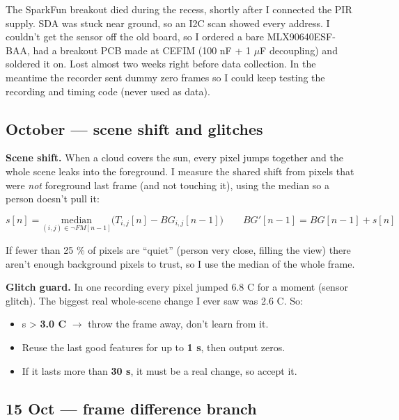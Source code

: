 \documentclass[11pt,a4paper]{article}
\providecommand{\tightlist}{\setlength{\itemsep}{0pt}\setlength{\parskip}{0pt}}
\begin{document}
The SparkFun breakout died
during the recess, shortly
after I connected the PIR
supply. SDA was stuck near
ground, so an I2C scan showed
every address. I couldn't get
the sensor off the old board,
so I ordered a bare
MLX90640ESF-BAA, had a
breakout PCB made at CEFIM
(100 nF + 1 $\mu$F decoupling) and
soldered it on. Lost almost
two weeks right before data
collection. In the meantime
the recorder sent dummy zero
frames so I could keep testing
the recording and timing code
(never used as data).

\hypertarget{october-scene-shift-and-glitches}{%
\subsection{October --- scene
shift and
glitches}\label{october-scene-shift-and-glitches}}

\textbf{Scene shift.} When a
cloud covers the sun, every
pixel jumps together and the
whole scene leaks into the
foreground. I measure the
shared shift from pixels that
were \emph{not} foreground
last frame (and not touching
it), using the median so a
person doesn't pull it:

\[
s[n] = \underset{(i,j)\in\neg FM[n-1]}{\mathrm{median}}\big(T_{i,j}[n]-BG_{i,j}[n-1]\big) \qquad BG'[n-1] = BG[n-1] + s[n]
\]

If fewer than 25 \% of pixels
are ``quiet'' (person very
close, filling the view) there
aren't enough background
pixels to trust, so I use the
median of the whole frame.

\textbf{Glitch guard.} In one
recording every pixel jumped
6.8 \textdegree{}C for a moment (sensor
glitch). The biggest real
whole-scene change I ever saw
was 2.6 \textdegree{}C. So:

\begin{itemize}
\tightlist
\item
  \textbar s\textbar{}
  \textgreater{} \textbf{3.0
  \textdegree{}C} $\rightarrow$ throw the frame away,
  don't learn from it.
\item
  Reuse the last good features
  for up to \textbf{1 s}, then
  output zeros.
\item
  If it lasts more than
  \textbf{30 s}, it must be a
  real change, so accept it.
\end{itemize}

\hypertarget{oct-frame-difference-branch}{%
\subsection{15 Oct --- frame
difference
branch}\label{oct-frame-difference-branch}}
\end{document}
